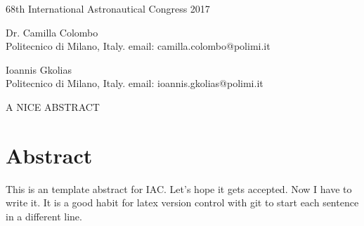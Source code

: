 \documentclass[10pt]{article}
\begin{document}
\begin{center}
68th International Astronautical Congress 2017
\vspace{30pt}


Dr. Camilla Colombo \\
Politecnico di Milano, Italy. email: camilla.colombo@polimi.it

Ioannis Gkolias \\
Politecnico di Milano, Italy. email: ioannis.gkolias@polimi.it


\bigskip

A NICE ABSTRACT
\vspace{12pt}
\end{center}

\section*{Abstract} %
\vspace{-4pt}

This is an template abstract for IAC. 
Let's hope it gets accepted. 
Now I have to write it.
It is a good habit for latex version control with git to start each sentence in a different line.
\end{document}
